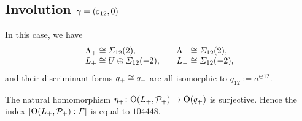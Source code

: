 \documentclass{amsart} %
\begin{document}
\subsection{Involution $\gamma=(\varepsilon_{12}, 0)$}\label{subsec:walls12}
%
%
In this case, we have
\[
\begin{array}{ll}
\Lambda_{+}\cong \varSigma_{12}(2), \quad &\Lambda_{-}\cong \varSigma_{12}(2),\\
L_{+}\cong U\oplus \varSigma_{12}(-2), \quad &L_{-}\cong \varSigma_{12}(-2), 
\end{array}
\]
and their discriminant forms $q_{+}\cong q_{-}$ are all isomorphic to
$q_{12}:=a^{\oplus 12}$.
%
%
%
% 
%
%
\begin{proposition}
The natural homomorphism 
${\eta}_{+}\colon \mathord{\mathrm{O}}(L_{+}, \mathord{\mathcal{P}}_{+}) \to \mathord{\mathrm{O}}(q_{+})$ is surjective.
Hence the index 
$[\mathord{\mathrm{O}}(L_{+}, \mathord{\mathcal{P}}_{+}): \varGamma]$ is equal to 
$104448$.
\end{proposition}
%
\end{document}
